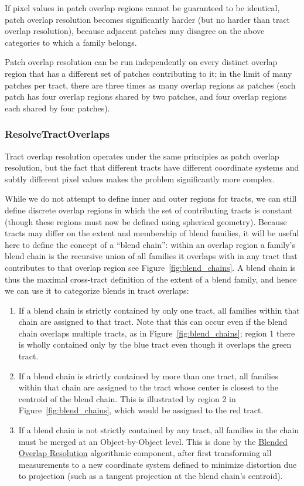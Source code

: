 If pixel values in patch overlap regions cannot be guaranteed to be identical, patch overlap resolution becomes significantly harder (but no harder than tract overlap resolution), because adjacent patches may disagree on the above categories to which a family belongs.

Patch overlap resolution can be run independently on every distinct overlap region that has a different set of patches contributing to it; in the limit of many patches per tract, there are three times as many overlap regions as patches (each patch has four overlap regions shared by two patches, and four overlap regions each shared by four patches).

\subsubsection{ResolveTractOverlaps}
\label{sec:drpResolveTractOverlaps}

Tract overlap resolution operates under the same principles as patch overlap resolution, but the fact that different tracts have different coordinate systems and subtly different pixel values makes the problem significantly more complex.

While we do not attempt to define inner and outer regions for tracts, we can still define discrete overlap regions in which the set of contributing tracts is constant (though these regions must now be defined using spherical geometry).  Because tracts may differ on the extent and membership of blend families, it will be useful here to define the concept of a ``blend chain'': within an overlap region a family's blend chain is the recursive union of all families it overlaps with in any tract that contributes to that overlap region see Figure~\ref{fig:blend_chains}.  A blend chain is thus the maximal cross-tract definition of the extent of a blend family, and hence we can use it to categorize blends in tract overlaps:
\begin{enumerate}
\item If a blend chain is strictly contained by only one tract, all families within that chain are assigned to that tract.  Note that this can occur even if the blend chain overlaps multiple tracts, as in Figure~\ref{fig:blend_chains}; region 1 there is wholly contained only by the blue tract even though it overlaps the green tract.
\item If a blend chain is strictly contained by more than one tract, all families within that chain are assigned to the tract whose center is closest to the centroid of the blend chain.  This is illustrated by region 2 in Figure~\ref{fig:blend_chains}, which would be assigned to the red tract.
\item If a blend chain is not strictly contained by any tract, all families in the chain must be merged at an Object-by-Object level.  This is done by the \hyperref[sec:acBlendedOverlapResolution]{Blended Overlap Resolution} algorithmic component, after first transforming all measurements to a new coordinate system defined to minimize distortion due to projection (such as a tangent projection at the blend chain's centroid).
\end{enumerate}

